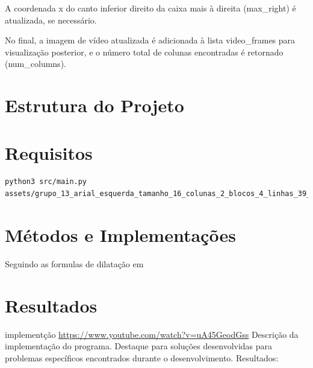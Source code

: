\documentclass[english, 
               brazil, 
               bsc] %
               {dcomp-abntex2}
\begin{document}
A coordenada x do canto inferior direito da caixa mais à direita (max_right) é atualizada, se necessário.

No final, a imagem de vídeo atualizada é adicionada à lista video_frames para visualização posterior, e o número total de colunas encontradas é retornado (num_columns).






\chapter{Estrutura do Projeto}

\chapter{Requisitos}

\begin{verbatim}
python3 src/main.py assets/grupo_13_arial_esquerda_tamanho_16_colunas_2_blocos_4_linhas_39_palavras_318.pbm
\end{verbatim}



\chapter{Métodos e Implementações}


Seguindo as formulas de dilatação em \cite[capitulo 9]{gonzalez2008digital}

\chapter{Resultados}

implementção \url{https://www.youtube.com/watch?v=uA45GeodGss}
Descrição da implementação do programa.
Destaque para soluções desenvolvidas para problemas específicos encontrados durante o desenvolvimento.
Resultados:
\end{document}
